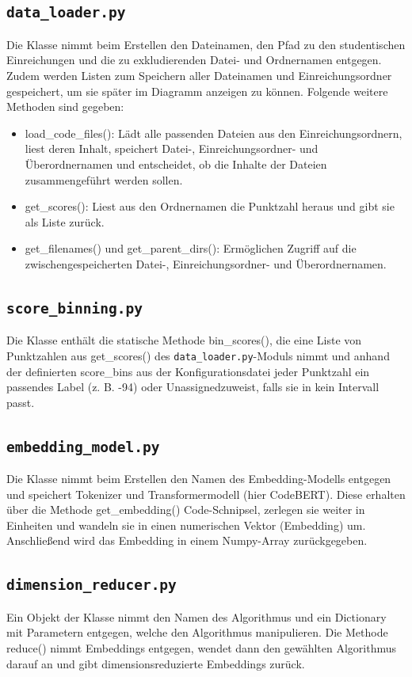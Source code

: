 \subsection{\texttt{data\_loader.py}}
\label{abs:data-loader}
Die Klasse nimmt beim Erstellen den Dateinamen, den Pfad zu den studentischen Einreichungen und die zu exkludierenden Datei- und Ordnernamen entgegen. Zudem werden Listen zum Speichern aller Dateinamen und Einreichungsordner gespeichert, um sie später im Diagramm anzeigen zu können. Folgende weitere Methoden sind gegeben:
\begin{itemize}
	\item load\_code\_files(): Lädt alle passenden Dateien aus den Einreichungsordnern, liest deren Inhalt, speichert Datei-, Einreichungsordner- und Überordnernamen und entscheidet, ob die Inhalte der Dateien zusammengeführt werden sollen.
	\item get\_scores(): Liest aus den Ordnernamen die Punktzahl heraus und gibt sie als Liste zurück.
	\item get\_filenames() und get\_parent\_dirs(): Ermöglichen Zugriff auf die zwischengespeicherten Datei-, Einreichungsordner- und Überordnernamen.
\end{itemize}


\subsection{\texttt{score\_binning.py}}
\label{abs:score-binning}
Die Klasse enthält die statische Methode bin\_scores(), die eine Liste von Punktzahlen aus get\_scores() des \texttt{data\_loader.py}-Moduls nimmt und anhand der definierten score\_bins aus der Konfigurationsdatei jeder Punktzahl ein passendes Label (z. B. -94\grqq) oder \glqq Unassigned\grqq zuweist, falls sie in kein Intervall passt.


\subsection{\texttt{embedding\_model.py}}
\label{abs:embedding-model}
Die Klasse nimmt beim Erstellen den Namen des Embedding-Modells entgegen und speichert Tokenizer und Transformermodell (hier CodeBERT). Diese erhalten über die Methode get\_embedding() Code-Schnipsel, zerlegen sie weiter in Einheiten und wandeln sie in einen numerischen Vektor (Embedding) um. Anschließend wird das Embedding in einem Numpy-Array zurückgegeben.


\subsection{\texttt{dimension\_reducer.py}}
\label{abs:dimension-reducer}
Ein Objekt der Klasse nimmt den Namen des Algorithmus und ein Dictionary mit Parametern entgegen, welche den Algorithmus manipulieren. Die Methode reduce() nimmt Embeddings entgegen, wendet dann den gewählten Algorithmus darauf an und gibt dimensionsreduzierte Embeddings zurück.


